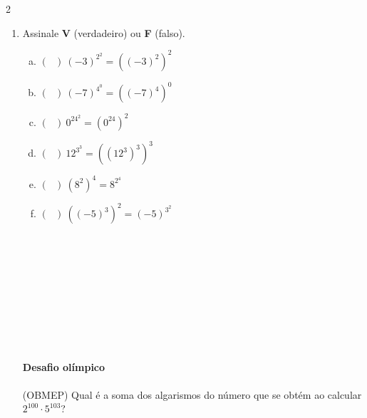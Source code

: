 \documentclass[a4paper,14pt]{article}
\begin{document}
\begin{multicols}{2}
\begin{enumerate}
\begin{enumerate}[a)]
    			\item $(-7)^{3^{3}}$ \\\\\\\\\\
    			\item $26^{8^2}$ \\\\\\\\\\
    			\item $(-135)^{2^4}$ \\\\\\\\\\
    			\item $(-11)^{6^3}$ \\\\\\\\\\
    		\end{enumerate}
    		\item Assinale \textbf{V} (verdadeiro) ou \textbf{F} (falso).
    		\begin{enumerate}[a)]
    			\item $(~~~)~(-3)^{2^2} = ((-3)^2)^2$
    			\item $(~~~)~(-7)^{4^0} = ((-7)^4)^0$
    			\item $(~~~)~0^{24^2} = (0^{24})^2$
    			\item $(~~~)~12^{3^3} = ((12^3)^{3})^{3}$
    			\item $(~~~)~(8^2)^{4} = 8^{2^4}$
    			\item $(~~~)~((-5)^3)^2 = (-5)^{3^2}$ \\\\\\\\\\\\\\\\\\\\
    		\end{enumerate}
    		\textbf{Desafio olímpico} \\\\
    		(OBMEP) Qual é a soma dos algarismos do número que se obtém ao calcular $2^{100} \cdot 5^{103}$? \\

\end{enumerate}
\end{multicols}
\end{document}
